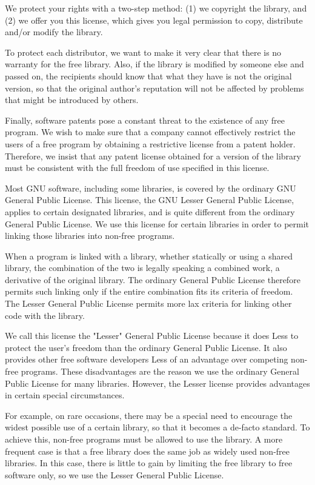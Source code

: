 \begin{DoxyCode}
  We protect your rights with a two-step method: (1) we copyright the
library, and (2) we offer you this license, which gives you legal
permission to copy, distribute and/or modify the library.

  To protect each distributor, we want to make it very clear that
there is no warranty for the free library.  Also, if the library is
modified by someone else and passed on, the recipients should know
that what they have is not the original version, so that the original
author's reputation will not be affected by problems that might be
introduced by others.

  Finally, software patents pose a constant threat to the existence of
any free program.  We wish to make sure that a company cannot
effectively restrict the users of a free program by obtaining a
restrictive license from a patent holder.  Therefore, we insist that
any patent license obtained for a version of the library must be
consistent with the full freedom of use specified in this license.

  Most GNU software, including some libraries, is covered by the
ordinary GNU General Public License.  This license, the GNU Lesser
General Public License, applies to certain designated libraries, and
is quite different from the ordinary General Public License.  We use
this license for certain libraries in order to permit linking those
libraries into non-free programs.

  When a program is linked with a library, whether statically or using
a shared library, the combination of the two is legally speaking a
combined work, a derivative of the original library.  The ordinary
General Public License therefore permits such linking only if the
entire combination fits its criteria of freedom.  The Lesser General
Public License permits more lax criteria for linking other code with
the library.

  We call this license the "Lesser" General Public License because it
does Less to protect the user's freedom than the ordinary General
Public License.  It also provides other free software developers Less
of an advantage over competing non-free programs.  These disadvantages
are the reason we use the ordinary General Public License for many
libraries.  However, the Lesser license provides advantages in certain
special circumstances.

  For example, on rare occasions, there may be a special need to
encourage the widest possible use of a certain library, so that it becomes
a de-facto standard.  To achieve this, non-free programs must be
allowed to use the library.  A more frequent case is that a free
library does the same job as widely used non-free libraries.  In this
case, there is little to gain by limiting the free library to free
software only, so we use the Lesser General Public License.


\end{DoxyCode}
